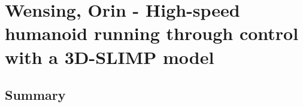 \section{Wensing, Orin - High-speed humanoid running through control with a 3D-SLIMP model}


\subsection*{Summary}